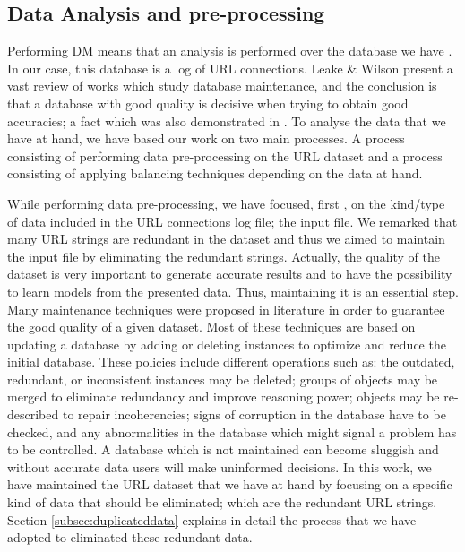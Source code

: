 \documentclass{llncs}
\begin{document}
\subsection{Data Analysis and pre-processing}
\label{subsec:dataanalysis}

Performing DM means that an analysis is performed over the database we have \cite{Frank2011}. In our case, this database is a log of URL connections. Leake \& Wilson  \cite{wilson2001maintaining} present a vast review of works which study database maintenance, and the conclusion is that a database with good quality is decisive when trying to obtain good accuracies; a fact which was also demonstrated in \cite{zeineb2014thesis}. To analyse the data that we have at hand, we have based our work on two main processes. A process consisting of performing data pre-processing on the URL dataset and a process consisting of applying balancing techniques depending on the data at hand. 

While performing data pre-processing, we have focused, first , on the kind/type of data included in the URL connections log file; the input file. We remarked that many URL strings are redundant in the dataset and thus we aimed to maintain the input file by eliminating the redundant strings. Actually, the quality of the dataset is very important to generate accurate results and to have the possibility to learn models from the presented data. Thus, maintaining it is an essential step. Many maintenance techniques were proposed in literature \cite{wilson2001maintaining} in order to guarantee the good quality of a given dataset.   Most of these techniques are based on updating a database by adding or deleting instances to optimize and reduce the initial database. 
These policies include different operations such as: the outdated, redundant, or inconsistent instances may be deleted; groups of objects may be merged to eliminate redundancy and improve reasoning power; objects may be re-described to repair incoherencies; signs of corruption in the database have to be checked, and any abnormalities in the database which might signal a problem has to be controlled. A database which is not maintained can become sluggish and without accurate data users will make uninformed decisions. In this work, we have maintained the URL dataset that we have at hand by focusing on a specific kind of data that should be eliminated; which are the redundant URL strings. Section \ref{subsec:duplicateddata} explains in detail the process that we have adopted to eliminated these redundant data.
\end{document}
